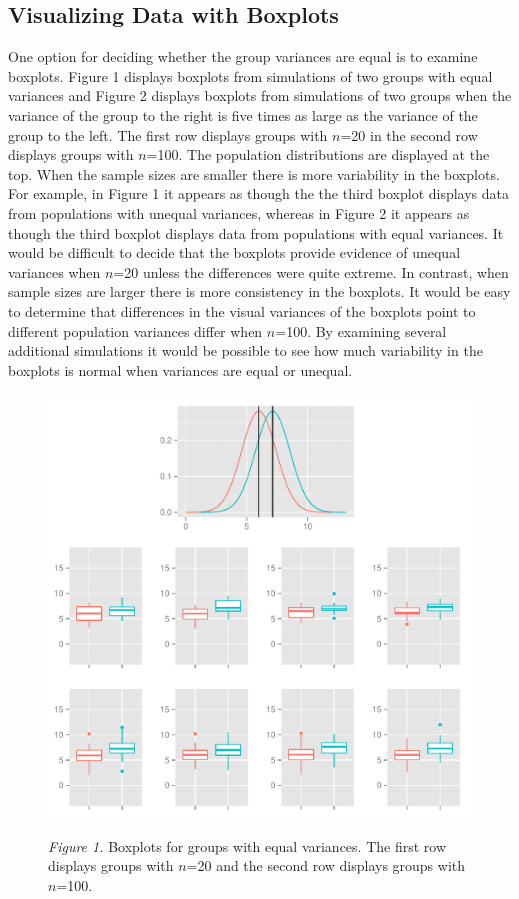 \documentclass[man,a4paper,noextraspace,apacite]{apa6}\usepackage[]{graphicx}\usepackage[]{color}
\makeatletter
\def\maxwidth{ %
  \ifdim\Gin@nat@width>\linewidth
    \linewidth
  \else
    \Gin@nat@width
  \fi
}
\newenvironment{knitrout}{}{} %
\makeatother
\begin{document}
\subsection{Visualizing Data with Boxplots} 
    One option for deciding whether the group variances are equal is to examine boxplots. Figure 1 displays boxplots from simulations of two groups with equal variances and Figure 2 displays boxplots from simulations of two groups when the variance of the group to the right is five times as large as the variance of the group to the left. The first row displays groups with $n$=20 in the second row displays groups with $n$=100. The population distributions are displayed at the top. When the sample sizes are smaller there is more variability in the boxplots. For example, in Figure 1 it appears as though the the third boxplot displays data from populations with unequal variances, whereas in Figure 2 it appears as though the third boxplot displays data from populations with equal variances. It would be difficult to decide that the boxplots provide evidence of unequal variances when $n$=20 unless the differences were quite extreme. In contrast, when sample sizes are larger there is more consistency in the boxplots. It would be easy to determine that differences in the visual variances of the boxplots point to different population variances differ when $n$=100. By examining several additional simulations it would be possible to see how much variability in the boxplots is normal when variances are equal or unequal.
   
\begin{figure}
\begin{knitrout}
\color{fgcolor}
\includegraphics[width=\maxwidth]{figure/varEqualBoxplots} 

\end{knitrout}
\textit{Figure 1.} Boxplots for groups with equal variances. The first row displays groups with $n$=20 and the second row displays groups with $n$=100.
\end{figure}
\end{document}
